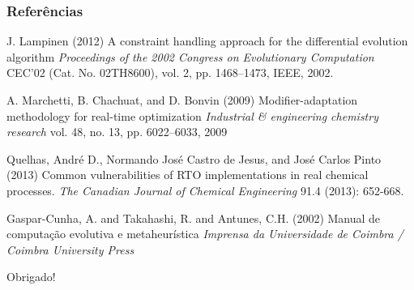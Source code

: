 \documentclass{beamer}
\begin{document}
\begin{frame}
\frametitle{Referências}
\footnotesize{
\begin{thebibliography}{99} %

 J. Lampinen (2012)
\newblock A constraint handling approach for the differential evolution algorithm
\newblock \emph{Proceedings of the 2002 Congress on Evolutionary
	Computation} CEC’02 (Cat. No. 02TH8600), vol. 2, pp. 1468–1473,
	IEEE, 2002.

 A. Marchetti, B. Chachuat, and D. Bonvin (2009)
\newblock Modifier-adaptation methodology for real-time optimization
\newblock \emph{Industrial \& engineering chemistry
	research} vol. 48, no. 13, pp. 6022–6033, 2009

 Quelhas, André D., Normando José Castro de Jesus, and José Carlos Pinto (2013) \newblock Common vulnerabilities of RTO implementations in real chemical processes.
\newblock \emph{The Canadian Journal of Chemical Engineering } 91.4 (2013): 652-668.

 Gaspar-Cunha, A. and Takahashi, R. and Antunes, C.H. (2002)
\newblock Manual de computação evolutiva e metaheurística
\newblock \emph{Imprensa da Universidade de Coimbra / Coimbra University Press}


\end{thebibliography}
}
\end{frame}


\begin{frame}
\Huge{\centerline{Obrigado!}}
\end{frame}

\end{document}
